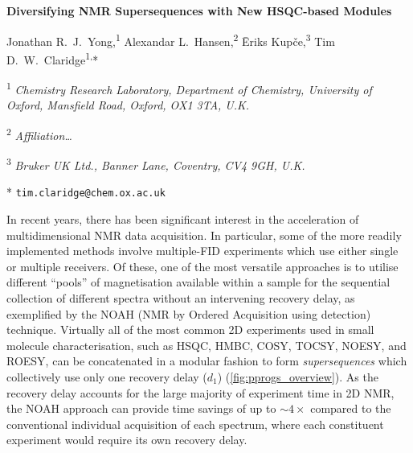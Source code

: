 \documentclass[11pt]{article}
\newcommand*{\hsqctitle}{Diversifying NMR Supersequences with New HSQC-based Modules}
\newcommand*{\hl}[1]{\textcolor{WildStrawberry}{#1}}
\newcommand*{\carbon}{\ce{^{13}C}}
\newcommand*{\proton}{\ce{^{1}H}}
\newcommand*{\nitrogen}{\ce{^{15}N}}
\begin{document}
\begin{center}
    \Large \textbf{\hsqctitle{}}

    \vspace{0.2cm}

    \large Jonathan R.\ J.\ Yong,\textsuperscript{1} Alexandar L.\ Hansen,\textsuperscript{2} {\=E}riks Kup{\v{c}}e,\textsuperscript{3} Tim D.\ W.\ Claridge\textsuperscript{1,}*

    \vspace{0.2cm}

    \normalsize

    \textsuperscript{1} \textit{Chemistry Research Laboratory, Department of Chemistry, University of Oxford, Mansfield Road, Oxford, OX1 3TA, U.K.}

    \hl{\textsuperscript{2} \textit{Affiliation\ldots}}

    \textsuperscript{3} \textit{Bruker UK Ltd., Banner Lane, Coventry, CV4 9GH, U.K.}

    * \texttt{tim.claridge@chem.ox.ac.uk}
\end{center}
\vspace{0.5cm}

\begin{abstract}
    The sensitivity-enhanced HSQC, as well as HSQC-TOCSY, experiments are incorporated into NOAH (NMR by Ordered Acquisition using \proton{} detection) supersequences, adding diversity for \carbon{} and \nitrogen{} modules.
    Importantly, these heteronuclear modules are specifically tailored to preserve the magnetisation required for subsequent acquisition of homonuclear modules in a supersequence.
    In addition, we present protocols for optimally combining HSQC and HSQC-TOCSY elements within the same supersequences, yielding high-quality 2D spectra suitable for structure characterisation but with greatly reduced experiment durations.
\end{abstract}


In recent years, there has been significant interest in the acceleration of multidimensional NMR data acquisition.\autocite{ultrafast, timeshared, multireceive}
In particular, some of the more readily implemented methods involve multiple-FID experiments which use either single or multiple receivers.
Of these, one of the most versatile approaches is to utilise different ``pools'' of magnetisation available within a sample for the sequential collection of different spectra without an intervening recovery delay, as exemplified by the NOAH (NMR by Ordered Acquisition using \proton{} detection) technique.\autocite{noah}
Virtually all of the most common 2D experiments used in small molecule characterisation, such as HSQC, HMBC, COSY, TOCSY, NOESY, and ROESY, can be concatenated in a modular fashion to form \textit{supersequences} which collectively use only one recovery delay ($d_1$) (\cref{fig:pprogs_overview}).
As the recovery delay accounts for the large majority of experiment time in 2D NMR, the NOAH approach can provide time savings of up to $\sim 4\times$ compared to the conventional individual acquisition of each spectrum, where each constituent experiment would require its own recovery delay.
\end{document}
